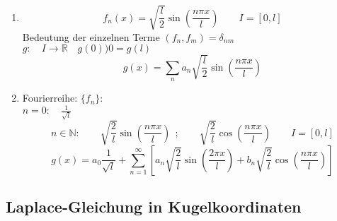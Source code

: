 \documentclass[titlepage,11pt,a4paper,ngerman]{report}
\begin{document}
\begin{enumerate}[1)]
	\item 
	\begin{equation*}
	f_n(x) = \sqrt{\frac{l}{2}} \sin\left(\frac{n \pi x}{l}\right) \qquad I = [0,l] 
	\end{equation*}Bedeutung der einzelnen Terme
	$ (f_n,f_m) = \delta_{nm} $\\
	$ g: \quad I \rightarrow \mathbb{R} \quad g(0) ) 0 = g(l) $
	\begin{equation*}
	g(x) = \sum_{n} a_n \sqrt{\frac{l}{2}} \sin \left(\frac{n \pi x}{l}\right)
	\end{equation*}
	\item Fourierreihe: $ \{f_n\} $:\\
	$ n=0: \quad \frac{1}{\sqrt{l}} $
	\begin{equation*}
	n \in \mathbb{N}: \qquad \sqrt{\frac{2}{l}} \sin \left(\frac{n \pi x}{l}\right) \ \ ; \qquad \sqrt{\frac{2}{l}} \cos\left(\frac{n \pi x}{l}\right) \qquad I = [0,l]
	\end{equation*}
	\begin{equation*}
	g(x) = a_0 \frac{1}{\sqrt{l}} + \sum_{n=1}^{\infty} \left[a_n \sqrt{\frac{2}{l}} \sin \left(\frac{2 \pi x}{l}\right) + b_n \sqrt{\frac{2}{l}} \cos\left(\frac{n \pi x}{l}\right)\right]
	\end{equation*}
	\vspace{5pt}
\end{enumerate}

\subsection{Laplace-Gleichung in Kugelkoordinaten}
\end{document}
